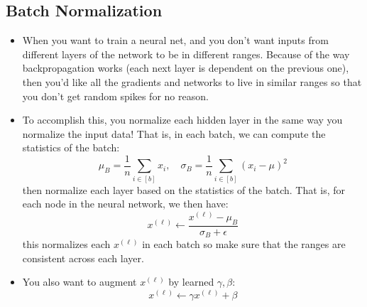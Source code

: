 \subsection{Batch Normalization}
\begin{itemize}
	\item When you want to train a neural net, and you don't want inputs from
		different layers of the network to be in different ranges. Because of the way
		backpropagation works (each next layer is dependent on the previous one),
		then you'd like all the gradients and networks to live in similar ranges so
		that you don't get random spikes for no reason.
	\item To accomplish this, you normalize each hidden layer in the same way you
		normalize the input data! That is, in each batch, we can compute the
		statistics of the batch:
		\[
			\mu_B = \frac{1}{n}\sum_{i \in [b]} x_i, \quad \sigma_B = \frac{1}{n}
			\sum_{i \in [b]}(x_i - \mu)^2
		\]
		then normalize each layer based on the statistics of the batch. That is, for
		each node in the neural network, we then have:
		\[
			x^{(\ell)} \leftarrow \frac{x^{(\ell)} - \mu_B}{\sigma_B + \epsilon}
		\]
		this normalizes each \( x^{(\ell)} \) in each batch so make sure that the
		ranges are consistent across each layer.  
	\item You also want to augment \( x^{(\ell)} \) by learned \( \gamma, \beta \):
		\[
			x^{(\ell)} \leftarrow \gamma x^{(\ell)}+ \beta
		\]

\end{itemize}
